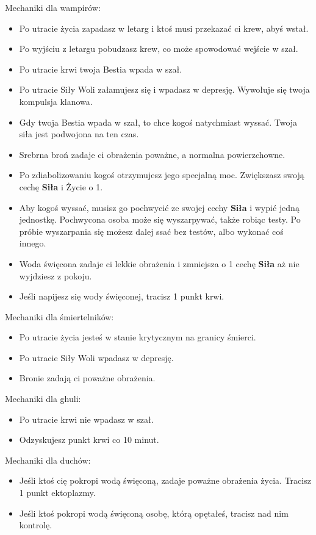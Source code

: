 	Mechaniki dla wampirów:
	\begin{itemize}
		\item Po utracie życia zapadasz w letarg i ktoś musi przekazać ci krew, abyś wstał.
		\item Po wyjściu z letargu pobudzasz krew, co może spowodować wejście w szał.
		\item Po utracie krwi twoja Bestia wpada w szał.
		\item Po utracie Siły Woli załamujesz się i wpadasz w depresję. Wywołuje się twoja kompulsja klanowa.
		\item Gdy twoja Bestia wpada w szał, to chce kogoś natychmiast wyssać. Twoja siła jest podwojona na ten czas.
		\item Srebrna broń zadaje ci obrażenia poważne, a normalna powierzchowne.
		\item Po zdiabolizowaniu kogoś otrzymujesz jego specjalną moc. Zwiększasz swoją cechę \textbf{Siła} i Życie o 1.
		\item Aby kogoś wyssać, musisz go pochwycić ze swojej cechy \textbf{Siła} i wypić jedną jednostkę. Pochwycona osoba może się wyszarpywać, także robiąc testy. Po próbie wyszarpania się możesz dalej ssać bez testów, albo wykonać coś innego.
		\item Woda święcona zadaje ci lekkie obrażenia i zmniejsza o 1 cechę \textbf{Siła} aż nie wyjdziesz z pokoju.
		\item Jeśli napijesz się wody święconej, tracisz 1 punkt krwi.
	\end{itemize}

	Mechaniki dla śmiertelników:
	\begin{itemize}
		\item Po utracie życia jesteś w stanie krytycznym na granicy śmierci.
		\item Po utracie Siły Woli wpadasz w depresję.
		\item Bronie zadają ci poważne obrażenia.
	\end{itemize}

	Mechaniki dla ghuli:
	\begin{itemize}
		\item Po utracie krwi nie wpadasz w szał.
		\item Odzyskujesz punkt krwi co 10 minut.
	\end{itemize}
	
	Mechaniki dla duchów:
	\begin{itemize}
		\item Jeśli ktoś cię pokropi wodą święconą, zadaje poważne obrażenia życia. Tracisz 1 punkt ektoplazmy.
		\item Jeśli ktoś pokropi wodą święconą osobę, którą opętałeś, tracisz nad nim kontrolę.
	\end{itemize}
		

